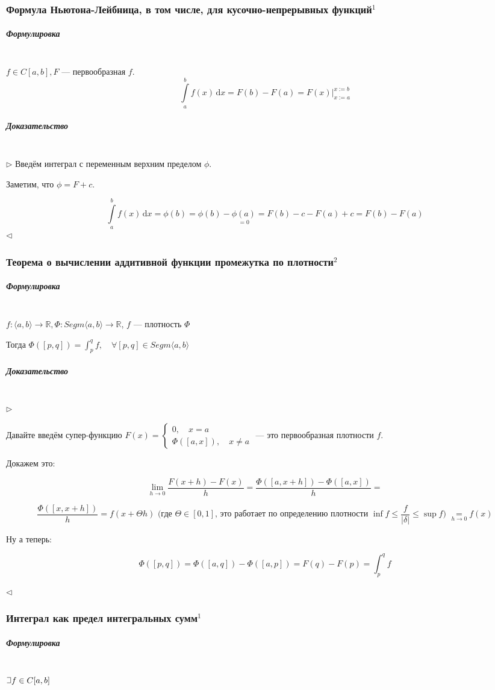 \documentclass{article}
\def\letus{%
\mathord{\setbox0=\hbox{$\exists$}%
         \hbox{\kern 0.125\wd0%
               \vbox to \ht0{%
                  \hrule width 0.75\wd0%
                  \vfill%
                  \hrule width 0.75\wd0}%
               \vrule height \ht0%
               \kern 0.125\wd0}%
       }%
        }
\def\D{\,\mathrm{d}}
\let\vanillasubparagraph\subparagraph
\renewcommand{\subparagraph}[1]{\vanillasubparagraph{#1}\mbox{}\\}
\begin{document}
\subsubsection{Формула Ньютона-Лейбница, в том числе, для кусочно-непрерывных функций\texorpdfstring{$^1$}{}}
\subparagraph{Формулировка}
$f \in C[a, b], F$ --- первообразная $f$. 
$$
\int\limits_a^b f(x)\D x = F(b) - F(a) = F(x)|^{x:=b}_{x:=a}
$$

\subparagraph{Доказательство}
$\rhd$
Введём интеграл с переменным верхним пределом $\phi$.

Заметим, что $\phi = F + c$.

$$
\int\limits_a^b f(x)\D x = \phi(b) = \phi(b) - \underset{=0}{\phi(a)} = F(b) - c - F(a) + c = F(b) - F(a)
$$
$\lhd$

\subsubsection{Теорема о вычислении аддитивной функции промежутка по плотности\texorpdfstring{$^2$}{}}

\subparagraph{Формулировка}

$f: \langle a, b \rangle \rightarrow \mathbb{R},  \Phi: Segm\langle a, b\rangle \rightarrow \mathbb{R}$, $f$ --- плотность $\Phi$

Тогда $\Phi\left([p, q]\right) = \int_p^q f,\quad \forall [p, q] \in Segm\langle a, b\rangle$

\subparagraph{Доказательство}

$\rhd$

Давайте введём супер-функцию $F(x) = \begin{cases}
0, \quad x = a \\
\Phi([a, x]), \quad x \neq a
\end{cases}$ --- это первообразная плотности $f$.

Докажем это:

\[\lim_{h \rightarrow 0}{\frac{F(x + h) - F(x)}{h}} = \frac{\Phi([a, x + h]) - \Phi([a, x])}{h} =\]

\[\frac{\Phi([x, x + h])}{h} = f(x + \Theta h) \text{  (где $\Theta \in [0, 1]$, это работает по определению плотности $\inf f \le \frac{f}{|\delta|} \le \sup f$)  } \underset{h \rightarrow 0}{=}  f(x)\]

Ну а теперь:

\[\Phi([p, q]) = \Phi([a, q]) - \Phi([a, p]) = F(q) - F(p) = \int_p^q{f} \]

$\lhd$


\subsubsection{Интеграл как предел интегральных сумм\texorpdfstring{$^1$}{}}
\subparagraph{Формулировка}
$\letus f\in C[a, b]$
\end{document}
